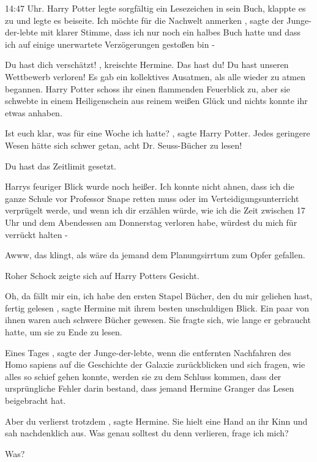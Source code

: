 14:47 Uhr. Harry Potter legte sorgfältig ein Lesezeichen in sein Buch, klappte
es zu und legte es beiseite. \glqq Ich möchte für die Nachwelt anmerken\grqq{} ,
sagte der Junge-der-lebte mit klarer Stimme, \glqq dass ich nur noch ein halbes
Buch hatte und dass ich auf einige unerwartete Verzögerungen gestoßen bin
-\grqq{}

\glqq Du hast dich verschätzt!\grqq{} , kreischte Hermine. \glqq Das hast du! Du
hast unseren Wettbewerb verloren!\grqq{} Es gab ein kollektives Ausatmen, als
alle wieder zu atmen begannen. Harry Potter schoss ihr einen flammenden
Feuerblick zu, aber sie schwebte in einem Heiligenschein aus reinem weißen Glück
und nichts konnte ihr etwas anhaben.

\glqq Ist euch klar, was für eine Woche ich hatte?\grqq{} , sagte Harry Potter.
\glqq Jedes geringere Wesen hätte sich schwer getan, acht Dr. Seuss-Bücher zu
lesen!\grqq{}

\glqq Du hast das Zeitlimit gesetzt.\grqq{}

Harrys feuriger Blick wurde noch heißer. \glqq Ich konnte nicht ahnen, dass ich
die ganze Schule vor Professor Snape retten muss oder im Verteidigungsunterricht
verprügelt werde, und wenn ich dir erzählen würde, wie ich die Zeit zwischen 17
Uhr und dem Abendessen am Donnerstag verloren habe, würdest du mich für verrückt
halten -\grqq{}

\glqq Awww, das klingt, als wäre da jemand dem Planungsirrtum zum Opfer
gefallen.\grqq{}

Roher Schock zeigte sich auf Harry Potters Gesicht.

\glqq Oh, da fällt mir ein, ich habe den ersten Stapel Bücher, den du mir
geliehen hast, fertig gelesen\grqq{} , sagte Hermine mit ihrem besten
unschuldigen Blick. Ein paar von ihnen waren auch schwere Bücher gewesen. Sie
fragte sich, wie lange er gebraucht hatte, um sie zu Ende zu lesen.

\glqq Eines Tages\grqq{} , sagte der Junge-der-lebte, \glqq wenn die entfernten
Nachfahren des Homo sapiens auf die Geschichte der Galaxie zurückblicken und
sich fragen, wie alles so schief gehen konnte, werden sie zu dem Schluss kommen,
dass der ursprüngliche Fehler darin bestand, dass jemand Hermine Granger das
Lesen beigebracht hat.\grqq{}

\glqq Aber du verlierst trotzdem\grqq{} , sagte Hermine. Sie hielt eine Hand an
ihr Kinn und sah nachdenklich aus. \glqq Was genau solltest du denn verlieren,
frage ich mich?\grqq{}

\glqq Was?\grqq{}

